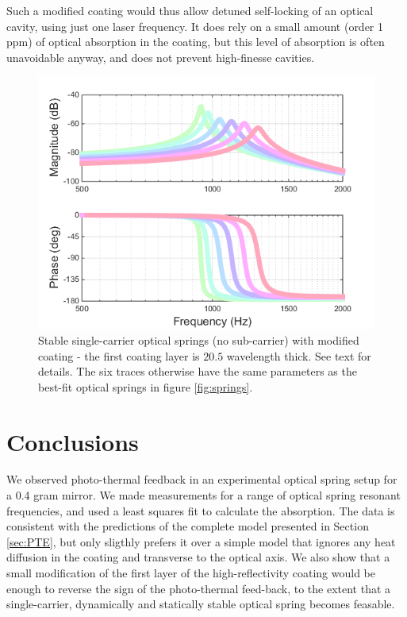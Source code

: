 Such a modified coating would thus allow detuned self-locking  of an optical cavity, using just one laser frequency. It does rely on a small amount (order 1 ppm) of optical absorption in the coating, but this level of absorption is often unavoidable anyway, and does not prevent high-finesse cavities. 
\begin{figure}[thb]
\centering
\includegraphics[width=.7\paperwidth]{figures/photothermal/singleCarrierSprings}
\caption[Stable single-carrier optical springs]{Stable single-carrier optical springs (no sub-carrier) with modified coating - the first coating layer is $20.5$ wavelength thick. See text for details. The six traces otherwise have the same parameters as the best-fit optical springs in figure \ref{fig:springs}. }
\label{fig:SCsprings}
\end{figure}








\section{Conclusions}
We observed photo-thermal feedback in an experimental optical spring setup for a 0.4 gram mirror. We made measurements for a range of optical spring resonant frequencies, and used a least squares fit to calculate the absorption. The data is consistent with the predictions of the complete model presented in Section \ref{sec:PTE}, but only sligthly prefers it over a simple model that ignores any heat diffusion in the coating and transverse to the optical axis. We also show that a small modification of the first layer of the high-reflectivity coating would be enough to reverse the sign of the photo-thermal feed-back, to the extent that a single-carrier, dynamically and statically stable optical spring becomes feasable.

